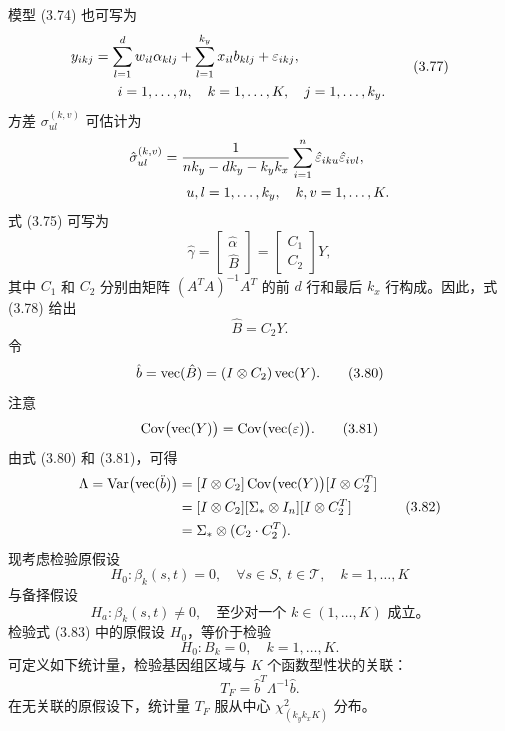 模型 (3.74) 也可写为
\begin{equation}
\begin{aligned}
y_{ikj}&=\sum_{l=1}^{d}w_{il}\alpha_{klj}+\sum_{l=1}^{k_y}x_{il}b_{klj}+\varepsilon_{ikj},\\
&\hspace{.6cm}i=1,\ldots,n,\quad k=1,\ldots,K,\quad j=1,\ldots,k_y.
\end{aligned}
\tag{3.77}
\end{equation}
方差 $\sigma_{ul}^{(k,v)}$ 可估计为
\[
\begin{aligned}
\hat\sigma_{ul}^{(k,v)}&=\frac{1}{nk_y-dk_y-k_yk_x}
\sum_{i=1}^{n}\hat\varepsilon_{iku}\hat\varepsilon_{ivl},\\
&\hspace{.6cm}u,l=1,\ldots,k_y,\quad k,v=1,\ldots,K.
\end{aligned}
\]
式 (3.75) 可写为
\begin{equation}
\hat\gamma=\begin{bmatrix}\hat\alpha\\\hat B\end{bmatrix}
=\begin{bmatrix}C_1\\C_2\end{bmatrix}Y,
\tag{3.78}
\end{equation}
其中 $C_1$ 和 $C_2$ 分别由矩阵 $(A^TA)^{-1}A^T$ 的前 $d$ 行和最后 $k_x$ 行构成。因此，式 (3.78) 给出
\begin{equation}
\hat B=C_2Y.
\tag{3.79}
\end{equation}
令
\begin{equation}
\hat b=\operatorname{vec}(\hat B)=(I\otimes C_2)\operatorname{vec}(Y).
\tag{3.80}
\end{equation}
注意
\begin{equation}
\operatorname{Cov}\bigl(\operatorname{vec}(Y)\bigr)=\operatorname{Cov}\bigl(\operatorname{vec}(\varepsilon)\bigr).
\tag{3.81}
\end{equation}
由式 (3.80) 和 (3.81)，可得
\begin{equation}
\begin{aligned}
\Lambda=\operatorname{Var}\bigl(\operatorname{vec}(\ddot b)\bigr)
&=[I\otimes C_2]\operatorname{Cov}\bigl(\operatorname{vec}(Y)\bigr)[I\otimes C_2^T]\\
&=[I\otimes C_2][\Sigma_*\otimes I_n][I\otimes C_2^T]\\
&=\Sigma_*\otimes(C_2\cdot C_2^T).
\end{aligned}
\tag{3.82}
\end{equation}
现考虑检验原假设
\begin{equation}
H_0:\beta_k(s,t)=0,\quad \forall s\in S,\ t\in\mathcal T,\quad k=1,\ldots,K
\tag{3.83}
\end{equation}
与备择假设
\[
H_a:\beta_k(s,t)\ne0,\quad \text{至少对一个 }k\in(1,\ldots,K)\text{ 成立。}
\]
检验式 (3.83) 中的原假设 $H_0$，等价于检验
\begin{equation}
H_0:B_k=0,\quad k=1,\ldots,K.
\tag{3.84}
\end{equation}
可定义如下统计量，检验基因组区域与 $K$ 个函数型性状的关联：
\begin{equation}
T_F=\hat b^T\Lambda^{-1}\hat b.
\tag{3.85}
\end{equation}
在无关联的原假设下，统计量 $T_F$ 服从中心 $\chi^2_{(k_yk_xK)}$ 分布。
\FloatBarrier
